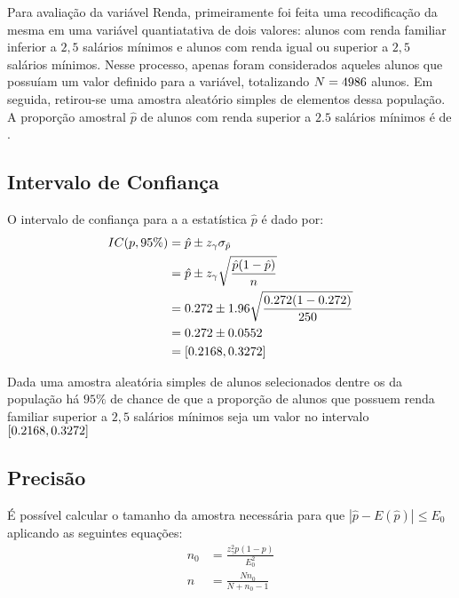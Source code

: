 

Para avaliação da variável Renda, primeiramente foi feita uma recodificação
da mesma em uma variável quantiatativa de dois valores: alunos com renda
familiar inferior a $2,5$ salários mínimos e alunos com renda igual ou
superior a $2,5$ salários mínimos. Nesse processo, apenas foram considerados
aqueles alunos que possuíam um valor definido para a variável, totalizando
$N=4986$ alunos. Em seguida, retirou-se uma amostra aleatório simples de
\SEISn elementos dessa população. A proporção amostral $\hat{p}$ de alunos
com renda superior a $2.5$ salários mínimos é de \SEISpAmostral.

\subsection{Intervalo de Confiança}

	O intervalo de confiança para a a estatística $\hat{p}$ é dado por:
	\begin{align*}
		IC(p, 95\%) &= \hat{p} \pm z_\gamma \sigma_{\hat{p}} \\
					&= \hat{p} \pm z_\gamma \sqrt{\frac{\hat{p}(1-\hat{p})}{n}} \\
					&= 0.272 \pm 1.96 \sqrt{\frac{0.272 (1- 0.272)}{250}} \nonumber \\
					&= 0.272 \pm 0.0552 \nonumber \\
					&= [0.2168, 0.3272]
	\end{align*}

	\noindent Dada uma amostra aleatória simples de \SEISn alunos
	selecionados dentre os \SEISN da população há $95\%$ de chance de que a
	proporção de alunos que possuem renda familiar superior a $2,5$ salários
	mínimos seja um valor no intervalo $[0.2168, 0.3272]$

\subsection{Precisão}
	
	É possível calcular o tamanho da amostra necessária para que $|\hat{p} -
	E(\hat{p})| \leq E_0$ aplicando as seguintes equações:
	\begin{align}
		n_0 &= \label{eq:seis-b-n0}
			   \frac{z_\gamma^2 p(1-p)}{E_0^2} \\
		n &= \label{eq:seis-b-n}
			 \frac{N n_0}{N + n_0 - 1} 
	\end{align}

